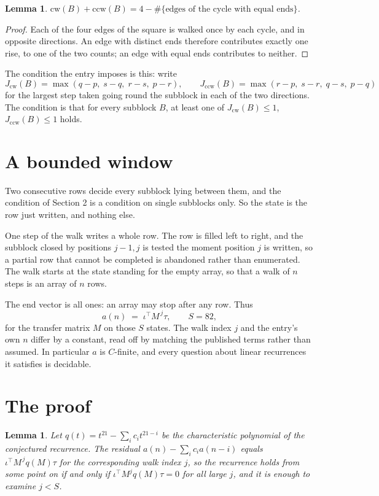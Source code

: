 \documentclass[11pt,a4paper]{article}
\theoremstyle{plain}
\newtheorem{lemma}[theorem]{Lemma}
\theoremstyle{definition}
\begin{document}
\begin{lemma}\label{lem:sum}
$\mathrm{cw}(B)+\mathrm{ccw}(B)=4-\#\{\text{edges of the cycle with equal ends}\}$.
\end{lemma}

\begin{proof}
Each of the four edges of the square is walked once by each cycle, and in opposite directions.
An edge with distinct ends therefore contributes exactly one rise, to one of the two counts;
an edge with equal ends contributes to neither.
\end{proof}

The condition the entry imposes is this: write
\[
J_{\mathrm{cw}}(B)=\max(q-p,\;s-q,\;r-s,\;p-r),\qquad J_{\mathrm{ccw}}(B)=\max(r-p,\;s-r,\;q-s,\;p-q)
\]
for the largest step taken going round the subblock in each of the two directions. The condition is that for every subblock $B$, at least one of $J_{\mathrm{cw}}(B)\le 1$, $J_{\mathrm{ccw}}(B)\le 1$ holds.

\section{A bounded window}

Two consecutive rows decide every subblock lying between them, and the condition of Section 2 is a condition on single subblocks only. So the state is the row just written, and nothing else.

One step of the walk writes a whole row. The row is filled left to right, and the subblock
closed by positions $j-1,j$ is tested the moment position $j$ is written, so a partial row that
cannot be completed is abandoned rather than enumerated. The walk starts at the state standing
for the empty array, so that a walk of $n$ steps is an array of $n$ rows.

The end vector is all ones: an array may stop after any row. Thus
\[
a(n)\;=\;\iota^{\!\top}M^{\,j}\tau ,\qquad S=82,
\]
for the transfer matrix $M$ on those $S$ states. The walk index $j$ and the entry's own $n$
differ by a constant, read off by matching the published terms rather than assumed. In
particular $a$ is $C$-finite, and every question about linear recurrences it satisfies is
decidable.

\section{The proof}

\begin{lemma}\label{lem:crit}
Let $q(t)=t^{21}-\sum_i c_it^{21-i}$ be the characteristic polynomial of the
conjectured recurrence. The residual $a(n)-\sum_ic_ia(n-i)$ equals
$\iota^{\!\top}M^{\,j}q(M)\tau$ for the corresponding walk index $j$, so the recurrence
holds from some point on if and only if $\iota^{\!\top}M^{j}q(M)\tau=0$ for all large $j$,
and it is enough to examine $j<S$.
\end{lemma}
\end{document}
